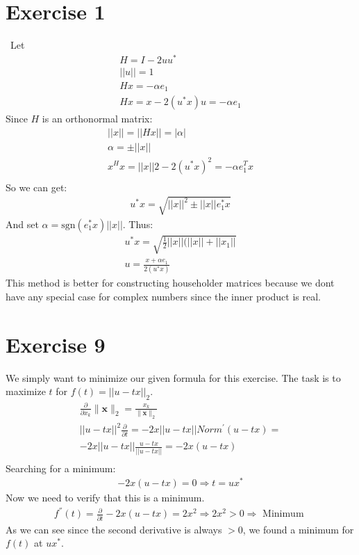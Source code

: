 
\section{Exercise 1}\
Let
\begin{gather*}
H = I - 2 uu^* \\
|| u || = 1 \\
Hx = - \alpha e_1 \\
Hx = x- 2( u^*x)u = -\alpha e_1
\end{gather*}
Since $H$ is an orthonormal matrix:
\begin{gather*}
||x|| = || Hx|| = |\alpha| \\
\alpha = \pm ||x||\\
x^Hx = ||x||2 -2(u^*x)^2 = - \alpha e_1^T x\\
\end{gather*}
So we can get:
\begin{gather*}
u^*x = \sqrt{||x||^2 \pm ||x|| e_1^* x}
\end{gather*}
And set $\alpha = \text{sgn}(e_1^*x) ||x||$.
Thus:
\begin{gather*}
u^*x = \sqrt{\frac{1}{2} ||x||(||x|| + ||x_1||}\\
u = \frac{x+\alpha e_1}{2(u^* x)}
\end{gather*}
This method is better for constructing householder matrices because we dont have any special case for complex numbers since the inner product is real.

\section{Exercise 9}
We simply want to minimize our given formula for this exercise. 
The task is to maximize $t$ for $f(t) = || u - tx||_2$.
\begin{gather*}
\frac{\partial}{\partial x_k} \|\mathbf{x}\|_2 = \frac{x_k}{\|\mathbf{x}\|_2}\\
||u-tx||^2 \frac{\partial}{\partial t} = -2x || u -tx || Norm^{'}(u-tx) = \\
- 2x || u -tx || \frac{u-tx}{|| u-tx ||} = -2x( u-tx) \\
\end{gather*}
Searching for a minimum:
\begin{gather*}
-2x( u-tx) = 0 \Rightarrow t = u x^{*}
\end{gather*}
Now we need to verify that this is a minimum.
\begin{gather*}
f^{''}(t) = \frac{\partial}{\partial t} -2x( u-tx) = 2x^2 \Rightarrow 2x^2 > 0 \Rightarrow \text{ Minimum }
\end{gather*}
As we can see since the second derivative is always $>0$, we found a minimum for $f(t)$ at $u x^{*}$.
